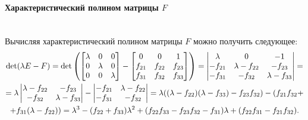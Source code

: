 \documentclass[12pt,a4paper,openany]{extarticle}
\begin{document}
\paragraph*{Характеристический полином матрицы $F$}$\phantom{-}$\\
\hspace*{\parindent}Вычисляя характеристический полином матрицы $F$ можно получить следующее:
\begin{multline}
\det(\lambda E - F) = 
\det\left(\begin{bmatrix}
\lambda & 0       & 0\\
0       & \lambda & 0\\
0       & 0       & \lambda
\end{bmatrix}
-
\begin{bmatrix}
0      & 0      & 1\\
f_{21} & f_{22} & f_{23}\\
f_{31} & f_{32} & f_{33}
\end{bmatrix}\right) = 
\begin{vmatrix}
\lambda      & 0                & -1\\
-f_{21}      & \lambda - f_{22} & -f_{23}\\
-f_{31}      & -f_{32}          & \lambda - f_{33}
\end{vmatrix} = \\
=
\lambda
\begin{vmatrix}
\lambda - f_{22} & -f_{23}\\
-f_{32}          & \lambda - f_{33}
\end{vmatrix}
-
\begin{vmatrix}
-f_{21}      & \lambda - f_{22}\\
-f_{31}      & -f_{32}
\end{vmatrix} = 
\lambda((\lambda - f_{22})(\lambda - f_{33}) - f_{23}f_{32}) - (f_{21}f_{32}+\\+f_{31}(\lambda - f_{22})) = \lambda^3 - (f_{22}+f_{33})\lambda^2 + (f_{22}f_{33} - f_{23}f_{32} - f_{31})\lambda + (f_{22}f_{31} - f_{21}f_{32})\ldotp
\end{multline}
\end{document}
